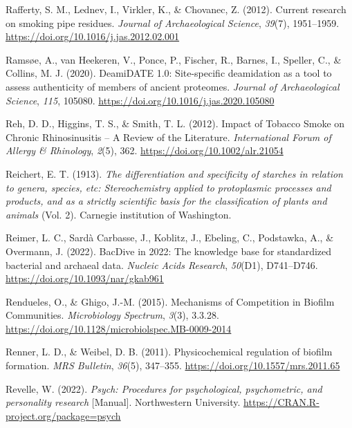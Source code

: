 \documentclass[
  letterpaper,
]{book}
\newlength{\cslhangindent}
\newlength{\cslentryspacingunit} %
\newenvironment{CSLReferences}[2] %
 {%
  \setlength{\parindent}{0pt}
  \ifodd #1
  \let\oldpar\par
  \def\par{\hangindent=\cslhangindent\oldpar}
  \fi
  \setlength{\parskip}{#2\cslentryspacingunit}
 }%
 {}
\begin{document}
\begin{CSLReferences}{1}{0}
\leavevmode{}%
Rafferty, S. M., Lednev, I., Virkler, K., \& Chovanec, Z. (2012).
Current research on smoking pipe residues. \emph{Journal of
Archaeological Science}, \emph{39}(7), 1951--1959.
\url{https://doi.org/10.1016/j.jas.2012.02.001}

\leavevmode{}%
Ramsøe, A., van Heekeren, V., Ponce, P., Fischer, R., Barnes, I.,
Speller, C., \& Collins, M. J. (2020). {DeamiDATE} 1.0: {Site-specific}
deamidation as a tool to assess authenticity of members of ancient
proteomes. \emph{Journal of Archaeological Science}, \emph{115}, 105080.
\url{https://doi.org/10.1016/j.jas.2020.105080}

\leavevmode{}%
Reh, D. D., Higgins, T. S., \& Smith, T. L. (2012). Impact of {Tobacco
Smoke} on {Chronic Rhinosinusitis} -- {A Review} of the {Literature}.
\emph{International Forum of Allergy \& Rhinology}, \emph{2}(5), 362.
\url{https://doi.org/10.1002/alr.21054}

\leavevmode{}%
Reichert, E. T. (1913). \emph{The differentiation and specificity of
starches in relation to genera, species, etc: Stereochemistry applied to
protoplasmic processes and products, and as a strictly scientific basis
for the classification of plants and animals} (Vol. 2). {Carnegie
institution of Washington}.

\leavevmode{}%
Reimer, L. C., Sardà Carbasse, J., Koblitz, J., Ebeling, C., Podstawka,
A., \& Overmann, J. (2022). {BacDive} in 2022: The knowledge base for
standardized bacterial and archaeal data. \emph{Nucleic Acids Research},
\emph{50}(D1), D741--D746. \url{https://doi.org/10.1093/nar/gkab961}

\leavevmode{}%
Rendueles, O., \& Ghigo, J.-M. (2015). Mechanisms of {Competition} in
{Biofilm Communities}. \emph{Microbiology Spectrum}, \emph{3}(3),
3.3.28. \url{https://doi.org/10.1128/microbiolspec.MB-0009-2014}

\leavevmode{}%
Renner, L. D., \& Weibel, D. B. (2011). Physicochemical regulation of
biofilm formation. \emph{MRS Bulletin}, \emph{36}(5), 347--355.
\url{https://doi.org/10.1557/mrs.2011.65}

\leavevmode{}%
Revelle, W. (2022). \emph{Psych: {Procedures} for psychological,
psychometric, and personality research} {[}Manual{]}. {Northwestern
University}. \url{https://CRAN.R-project.org/package=psych}


\end{CSLReferences}
\end{document}
